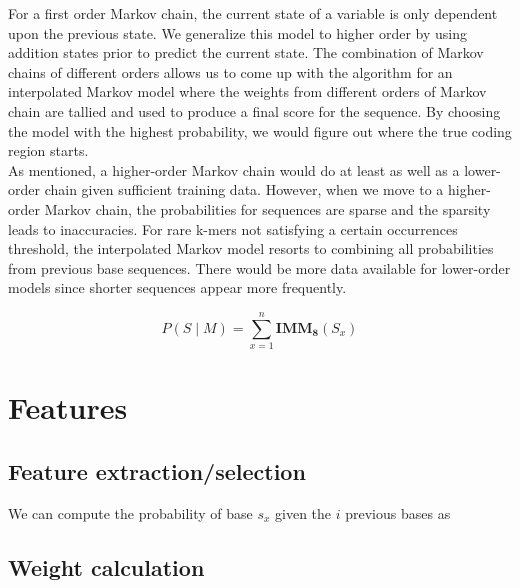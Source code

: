 \documentclass[11pt,letterpaper]{article}
\begin{document}
For a first order Markov chain, the current state of a variable is only dependent upon the previous state. We generalize this model to higher order by using addition states prior to predict the current state. The combination of Markov chains of different orders allows us to come up with the algorithm for an interpolated Markov model where the weights from different orders of Markov chain are tallied and used to produce a final score for the sequence. By choosing the model with the highest probability, we would figure out where the true coding region starts. \\

As mentioned, a higher-order Markov chain would do at least as well as a lower-order chain given sufficient training data. However, when we move to a higher-order Markov chain, the probabilities for sequences are sparse and the sparsity leads to inaccuracies. For rare k-mers not satisfying a certain occurrences threshold, the interpolated Markov model resorts to combining all probabilities from previous base sequences. There would be more data available for lower-order models since shorter sequences appear more frequently.


\begin{equation}
P(S \mid M) = \sum_{x=1}^{n} \mathbf{IMM_8}(S_x)
\end{equation}
\section{Features}
\label{ssec:layout}

\subsection{Feature extraction/selection}

We can compute the probability of base $s_x$ given the $i$ previous bases as

\subsection{Weight calculation}
\end{document}
